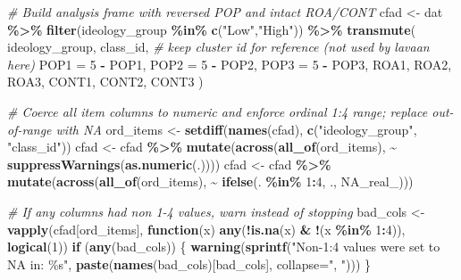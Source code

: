 \documentclass[
  10pt,
]{article}
\newenvironment{Shaded}{\begin{snugshade}}{\end{snugshade}}
\newcommand{\AttributeTok}[1]{\textcolor[rgb]{0.13,0.29,0.53}{#1}}
\newcommand{\CommentTok}[1]{\textcolor[rgb]{0.56,0.35,0.01}{\textit{#1}}}
\newcommand{\ConstantTok}[1]{\textcolor[rgb]{0.56,0.35,0.01}{#1}}
\newcommand{\ControlFlowTok}[1]{\textcolor[rgb]{0.13,0.29,0.53}{\textbf{#1}}}
\newcommand{\DecValTok}[1]{\textcolor[rgb]{0.00,0.00,0.81}{#1}}
\newcommand{\FunctionTok}[1]{\textcolor[rgb]{0.13,0.29,0.53}{\textbf{#1}}}
\newcommand{\NormalTok}[1]{#1}
\newcommand{\OtherTok}[1]{\textcolor[rgb]{0.56,0.35,0.01}{#1}}
\newcommand{\SpecialCharTok}[1]{\textcolor[rgb]{0.81,0.36,0.00}{\textbf{#1}}}
\newcommand{\StringTok}[1]{\textcolor[rgb]{0.31,0.60,0.02}{#1}}
\begin{document}
\begin{Shaded}
\begin{Highlighting}[]
\CommentTok{\# Build analysis frame with reversed POP and intact ROA/CONT}
\NormalTok{cfad }\OtherTok{\textless{}{-}}\NormalTok{ dat }\SpecialCharTok{\%\textgreater{}\%}
  \FunctionTok{filter}\NormalTok{(ideology\_group }\SpecialCharTok{\%in\%} \FunctionTok{c}\NormalTok{(}\StringTok{"Low"}\NormalTok{,}\StringTok{"High"}\NormalTok{)) }\SpecialCharTok{\%\textgreater{}\%}
  \FunctionTok{transmute}\NormalTok{(}
\NormalTok{    ideology\_group, class\_id,         }\CommentTok{\# keep cluster id for reference (not used by lavaan here)}
    \AttributeTok{POP1 =} \DecValTok{5} \SpecialCharTok{{-}}\NormalTok{ POP1,}
    \AttributeTok{POP2 =} \DecValTok{5} \SpecialCharTok{{-}}\NormalTok{ POP2,}
    \AttributeTok{POP3 =} \DecValTok{5} \SpecialCharTok{{-}}\NormalTok{ POP3,}
\NormalTok{    ROA1, ROA2, ROA3,}
\NormalTok{    CONT1, CONT2, CONT3}
\NormalTok{  )}

\CommentTok{\# Coerce all item columns to numeric and enforce ordinal 1:4 range; replace out{-}of{-}range with NA}
\NormalTok{ord\_items }\OtherTok{\textless{}{-}} \FunctionTok{setdiff}\NormalTok{(}\FunctionTok{names}\NormalTok{(cfad), }\FunctionTok{c}\NormalTok{(}\StringTok{"ideology\_group"}\NormalTok{, }\StringTok{"class\_id"}\NormalTok{))}
\NormalTok{cfad }\OtherTok{\textless{}{-}}\NormalTok{ cfad }\SpecialCharTok{\%\textgreater{}\%} \FunctionTok{mutate}\NormalTok{(}\FunctionTok{across}\NormalTok{(}\FunctionTok{all\_of}\NormalTok{(ord\_items), }\SpecialCharTok{\textasciitilde{}} \FunctionTok{suppressWarnings}\NormalTok{(}\FunctionTok{as.numeric}\NormalTok{(.))))}
\NormalTok{cfad }\OtherTok{\textless{}{-}}\NormalTok{ cfad }\SpecialCharTok{\%\textgreater{}\%} \FunctionTok{mutate}\NormalTok{(}\FunctionTok{across}\NormalTok{(}\FunctionTok{all\_of}\NormalTok{(ord\_items), }\SpecialCharTok{\textasciitilde{}} \FunctionTok{ifelse}\NormalTok{(. }\SpecialCharTok{\%in\%} \DecValTok{1}\SpecialCharTok{:}\DecValTok{4}\NormalTok{, ., }\ConstantTok{NA\_real\_}\NormalTok{)))}

\CommentTok{\# If any columns had non 1{-}4 values, warn instead of stopping}
\NormalTok{bad\_cols }\OtherTok{\textless{}{-}} \FunctionTok{vapply}\NormalTok{(cfad[ord\_items], }\ControlFlowTok{function}\NormalTok{(x) }\FunctionTok{any}\NormalTok{(}\SpecialCharTok{!}\FunctionTok{is.na}\NormalTok{(x) }\SpecialCharTok{\&} \SpecialCharTok{!}\NormalTok{(x }\SpecialCharTok{\%in\%} \DecValTok{1}\SpecialCharTok{:}\DecValTok{4}\NormalTok{)), }\FunctionTok{logical}\NormalTok{(}\DecValTok{1}\NormalTok{))}
\ControlFlowTok{if}\NormalTok{ (}\FunctionTok{any}\NormalTok{(bad\_cols)) \{}
  \FunctionTok{warning}\NormalTok{(}\FunctionTok{sprintf}\NormalTok{(}\StringTok{"Non{-}1:4 values were set to NA in: \%s"}\NormalTok{, }\FunctionTok{paste}\NormalTok{(}\FunctionTok{names}\NormalTok{(bad\_cols)[bad\_cols], }\AttributeTok{collapse=}\StringTok{", "}\NormalTok{)))}
\NormalTok{\}}
\end{Highlighting}
\end{Shaded}
\end{document}
